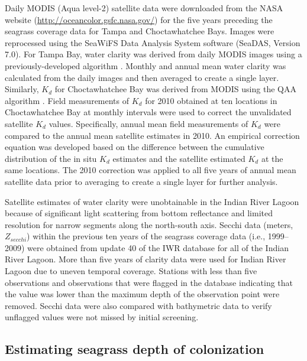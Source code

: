 \documentclass[letterpaper,12pt,oneside]{article}\usepackage[]{graphicx}\usepackage[]{color}
\begin{document}
Daily MODIS (Aqua level-2) satellite data were downloaded from the NASA website (\url{http://oceancolor.gsfc.nasa.gov/}) for the five years preceding the seagrass coverage data for Tampa and Choctawhatchee Bays.  Images were reprocessed using the SeaWiFS Data Analysis System software (SeaDAS, Version 7.0). For Tampa Bay, water clarity was derived from daily MODIS images using a previously-developed algorithm \citep{Chen07}. Monthly and annual mean water clarity was calculated from the daily images and then averaged to create a single layer. Similarly, $K_d$ for Choctawhatchee Bay was derived from MODIS using the QAA algorithm \citep{Lee05}.  Field measurements of $K_d$ for 2010 obtained at ten locations in Choctawhatchee Bay at monthly intervals were used to correct the unvalidated satellite $K_d$ values.  Specifically, annual mean field measurements of $K_d$ were compared to the annual mean satellite estimates in 2010.  An empirical correction equation was developed based on the difference between the cumulative distribution of the in situ $K_d$ estimates and the satellite estimated $K_d$ at the same locations.  The 2010 correction was applied to all five years of annual mean satellite data prior to averaging to create a single layer for further analysis.

Satellite estimates of water clarity were unobtainable in the Indian River Lagoon because of significant light scattering from bottom reflectance and limited resolution for narrow segments along the north-south axis.  Secchi data (meters, $Z_{secchi}$) within the previous ten years of the seagrass coverage data (i.e., 1999--2009) were obtained from update 40 of the \ac{IWR} database for all of the Indian River Lagoon.  More than five years of clarity data were used for Indian River Lagoon due to uneven temporal coverage.  Stations with less than five observations and observations that were flagged in the database indicating that the value was lower than the maximum depth of the observation point were removed.  Secchi data were also compared with bathymetric data to verify unflagged values were not missed by initial screening. 

\subsection{Estimating seagrass depth of colonization} \label{sec:est_method}
\end{document}
